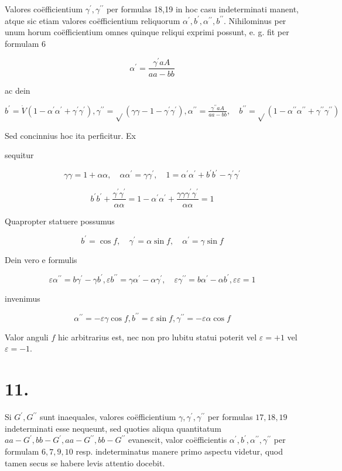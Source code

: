 \documentclass[10pt]{article}
\begin{document}
Valores coëfficientium \(\gamma^{\prime}, \gamma^{\prime \prime}\) per formulas 18,19 in hoc casu indeterminati manent, atque sic etiam valores coëfficientium reliquorum \(\alpha^{\prime}, b^{\prime}, \alpha^{\prime \prime}, b^{\prime \prime}\). Nihilominus per unum horum coëfficientium omnes quinque reliqui exprimi possunt, e. g. fit per formulam 6

\[
\alpha^{\prime}=\frac{\gamma^{\prime} a A}{a a-b b}
\]

ac dein

\(b^{\prime}=\dot{V}\left(1-\alpha^{\prime} \alpha^{\prime}+\gamma^{\prime} \gamma^{\prime}\right), \gamma^{\prime \prime}=\sqrt{ }\left(\gamma \gamma-1-\gamma^{\prime} \gamma^{\prime}\right), \alpha^{\prime \prime}=\frac{\gamma^{\prime \prime} a A}{a a-b b}, \quad b^{\prime \prime}=\sqrt{ }\left(1-\alpha^{\prime \prime} \alpha^{\prime \prime}+\gamma^{\prime \prime} \gamma^{\prime \prime}\right)\)

Sed concinnius hoc ita perficitur. Ex

sequitur

\[
\gamma \gamma=1+\alpha \alpha, \quad \alpha \alpha^{\prime}=\gamma \gamma^{\prime}, \quad 1=\alpha^{\prime} \alpha^{\prime}+b^{\prime} b^{\prime}-\gamma^{\prime} \gamma^{\prime}
\]

\[
b^{\prime} b^{\prime}+\frac{\gamma^{\prime} \gamma^{\prime}}{\alpha \alpha}=1-\alpha^{\prime} \alpha^{\prime}+\frac{\gamma \gamma \gamma^{\prime} \gamma^{\prime}}{\alpha \alpha}=1
\]

Quapropter statuere possumus

\[
b^{\prime}=\cos f, \quad \gamma^{\prime}=\alpha \sin f, \quad \alpha^{\prime}=\gamma \sin f
\]

Dein vero e formulis

\[
\varepsilon \alpha^{\prime \prime}=b \gamma^{\prime}-\gamma b^{\prime}, \varepsilon b^{\prime \prime}=\gamma \alpha^{\prime}-\alpha \gamma^{\prime}, \quad \varepsilon \gamma^{\prime \prime}=b \alpha^{\prime}-\alpha b^{\prime}, \varepsilon \varepsilon=1
\]

invenimus

\[
\alpha^{\prime \prime}=-\varepsilon \gamma \cos f, b^{\prime \prime}=\varepsilon \sin f, \gamma^{\prime \prime}=-\varepsilon \alpha \cos f
\]

Valor anguli \(f\) hic arbitrarius est, nec non pro lubitu statui poterit vel \(\varepsilon=+1\) vel \(\varepsilon=-1\).

\section*{11.}
Si \(G^{\prime}, G^{\prime \prime}\) sunt inaequales, valores coëfficientium \(\gamma, \gamma^{\prime}, \gamma^{\prime \prime}\) per formulas \(17,18,19\) indeterminati esse nequeunt, sed quoties aliqua quantitatum
\(a a-G^{\prime}, b b-G^{\prime}, a a-G^{\prime \prime}, b b-G^{\prime \prime}\) evanescit, valor coëfficientis \(\alpha^{\prime}, b^{\prime}, \alpha^{\prime \prime}, \gamma^{\prime \prime}\) per formulam \(6,7,9,10\) resp. indeterminatus manere primo aspectu videtur, quod tamen secus se habere levis attentio docebit.
\end{document}
